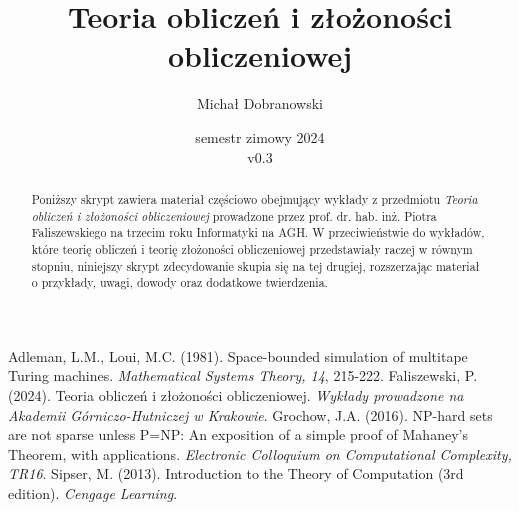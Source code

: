 \documentclass[bibliography=totocnumbered]{scrartcl}
\title{Teoria obliczeń i złożoności obliczeniowej}
\author{Michał Dobranowski}
\date{semestr zimowy 2024 \\ v0.3}
\begin{document}
    \maketitle
    \begin{abstract}
        \noindent Poniższy skrypt zawiera materiał częściowo obejmujący wykłady z przedmiotu \textit{Teoria obliczeń i złożoności obliczeniowej} prowadzone przez prof. dr. hab. inż. Piotra Faliszewskiego na trzecim roku Informatyki na AGH. W przeciwieństwie do wykładów, które teorię obliczeń i teorię złożoności obliczeniowej przedstawiały raczej w równym stopniu, niniejszy skrypt zdecydowanie skupia się na tej drugiej, rozszerzając materiał o przykłady, uwagi, dowody oraz dodatkowe twierdzenia.
    \end{abstract}
    \vspace*{\fill}
    {\footnotesize\doclicenseThis}
    \newpage

    \tableofcontents
    \newpage

    \SetVertexStyle[FillColor=gray, FillOpacity=0.4]
    \SetEdgeStyle[Color=black, LineWidth=0.8pt]

    
    

    \begin{thebibliography}{9}
         Adleman, L.M., Loui, M.C. (1981). Space-bounded simulation of multitape Turing machines. \textit{Mathematical Systems Theory, 14}, 215-222.
         Faliszewski, P. (2024). Teoria obliczeń i złożoności obliczeniowej. \textit{Wykłady prowadzone na Akademii Górniczo-Hutniczej w Krakowie}.
         Grochow, J.A. (2016). NP-hard sets are not sparse unless P=NP: An exposition of a simple proof of Mahaney's Theorem, with applications. \textit{Electronic Colloquium on Computational Complexity, TR16}.
         Sipser, M. (2013). Introduction to the Theory of Computation (3rd edition). \textit{Cengage Learning}.
    \end{thebibliography}
\end{document}
